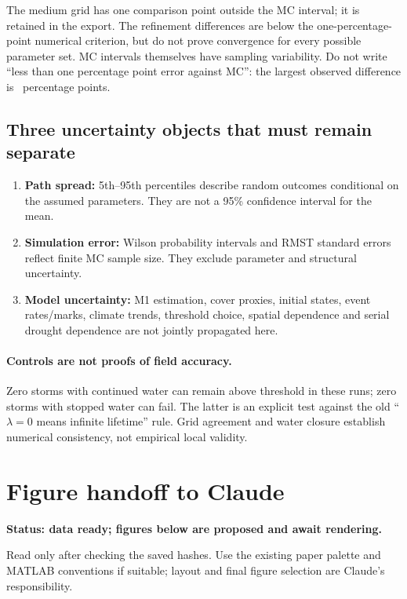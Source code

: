 \documentclass[11pt,a4paper]{article}
\newcommand{\file}[1]{{\small\texttt{\detokenize{#1}}}}
\begin{document}
The medium grid has one comparison point outside the MC interval; it is retained in the export.
The refinement differences are below the one-percentage-point numerical criterion, but do not prove
convergence for every possible parameter set. MC intervals themselves have sampling variability.
Do not write ``less than one percentage point error against MC'': the largest observed difference is
\MCError\ percentage points.

\subsection*{Three uncertainty objects that must remain separate}
\begin{enumerate}
\item \textbf{Path spread:} 5th--95th percentiles describe random outcomes conditional on the assumed parameters.
They are not a 95\% confidence interval for the mean.
\item \textbf{Simulation error:} Wilson probability intervals and RMST standard errors reflect finite MC sample size.
They exclude parameter and structural uncertainty.
\item \textbf{Model uncertainty:} M1 estimation, cover proxies, initial states, event rates/marks, climate trends,
threshold choice, spatial dependence and serial drought dependence are not jointly propagated here.
\end{enumerate}

\paragraph{Controls are not proofs of field accuracy.}
Zero storms with continued water can remain above threshold in these runs; zero storms with stopped
water can fail. The latter is an explicit test against the old ``$\lambda=0$ means infinite lifetime'' rule.
Grid agreement and water closure establish numerical consistency, not empirical local validity.

\clearpage
\section{Figure handoff to Claude}
\textbf{Status: data ready; figures below are proposed and await rendering.}\par
Read only \file{Results/v7/model3/} after checking the saved hashes. Use the existing paper palette and
MATLAB conventions if suitable; layout and final figure selection are Claude's responsibility.
\end{document}
